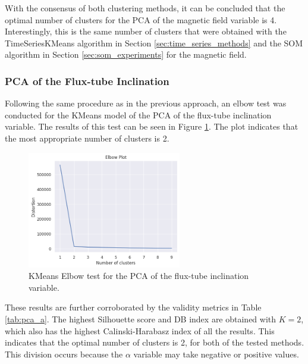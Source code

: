 With the consensus of both clustering methods, it can be concluded that the optimal number of clusters for the PCA of the magnetic field variable is 4. Interestingly, this is the same number of clusters that were obtained with the TimeSeriesKMeans algorithm in Section \ref{sec:time_series_methods} and the SOM algorithm in Section \ref{sec:som_experiments} for the magnetic field.

\subsubsection{PCA of the Flux-tube Inclination}\label{sec:pca_a}
Following the same procedure as in the previous approach, an elbow test was conducted for the KMeans model of the PCA of the flux-tube inclination variable. The results of this test can be seen in Figure \ref{fig:pca_a_elbow}. The plot indicates that the most appropriate number of clusters is 2.


\begin{figure}[h]
    \caption{KMeans Elbow test for the PCA of the flux-tube inclination variable.}
    \label{fig:pca_a_elbow}
    \centering
    \includegraphics[width=0.6\textwidth]{figures/pca_alpha_elbow_test.png}
\end{figure}

These results are further corroborated by the validity metrics in Table \ref{tab:pca_a}. The highest Silhouette score and DB index are obtained with $K=2$, which also has the highest Calinski-Harabasz index of all the results. This indicates that the optimal number of clusters is 2, for both of the tested methods. This division occurs because the $\alpha$ variable may take negative or positive values.

